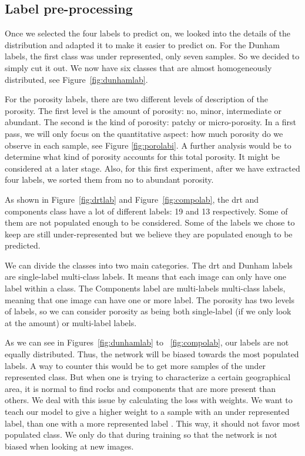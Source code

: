 \subsection{Label pre-processing}
Once we selected the four labels to predict on, we looked into the details of the distribution and adapted it to make it easier to predict on. For the Dunham labels, the first class was under represented, only seven samples. So we decided to simply cut it out. We now have six classes that are almost homogeneously distributed, see Figure~\ref{fig:dunhamlab}. 

For the porosity labels, there are two different levels of description of the porosity. The first level is the amount of porosity: no, minor, intermediate or abundant. The second is the kind of porosity: patchy or micro-porosity. In a first pass, we will only focus on the quantitative aspect: how much porosity do we observe in each sample, see Figure \ref{fig:porolabi}. A further analysis would be to determine what kind of porosity accounts for this total porosity. It might be considered at a later stage. Also, for this first experiment, after we have extracted four labels, we sorted them from no to abundant porosity. 

As shown in Figure~\ref{fig:drtlab} and Figure~\ref{fig:compolab}, the \gls{drt} and components class have a lot of different labels: 19 and 13 respectively. Some of them are not populated enough to be considered. Some of the labels we chose to keep are still under-represented but we believe they are populated enough to be predicted.

We can divide the classes into two main categories. The \gls{drt} and Dunham labels are single-label multi-class labels. It means that each image can only have one label within a class. The Components label are multi-labels multi-class labels, meaning that one image can have one or more label. The porosity has two levels of labels, so we can consider porosity as being both single-label (if we only look at the amount) or multi-label labels. 


As we can see in Figures~\ref{fig:dunhamlab} to ~\ref{fig:compolab}, our labels are not equally distributed. Thus, the network will be biased towards the most populated labels. A way to counter this would be to get more samples of the under represented class. But when one is trying to characterize a certain geographical area, it is normal to find rocks and components that are more present than others. We deal with this issue by calculating the loss with weights. We want to teach our model to give a higher weight to a sample with an under represented label, than one with a more represented label . This way, it should not favor most populated class. We only do that during training so that the network is not biased when looking at new images.  

